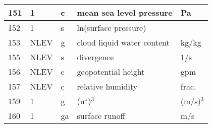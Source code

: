 \documentclass[a4paper,12pt]{article}
\begin{document}
\begin{table}[t]
\begin{tabular}[t]{|l|l|l|l|l|}
151 & 1    & c  & mean sea level pressure          & Pa              \\ \hline
152 & 1    & s  & ln(surface pressure)             &                 \\ \hline
153 & NLEV & g  & cloud liquid water content       & kg/kg           \\ \hline
155 & NLEV & s  & divergence                       & 1/s             \\ \hline
156 & NLEV & c  & geopotential height              & gpm             \\ \hline
157 & NLEV & c  & relative humidity                & frac.           \\ \hline
159 & 1    & g  & (u$^{\star}$)$^{3}$              & (m/s)$^{3}$     \\ \hline
160 & 1    & ga & surface runoff                   & m/s             \\ \hline

\end{tabular}

\end{table}
\end{document}
